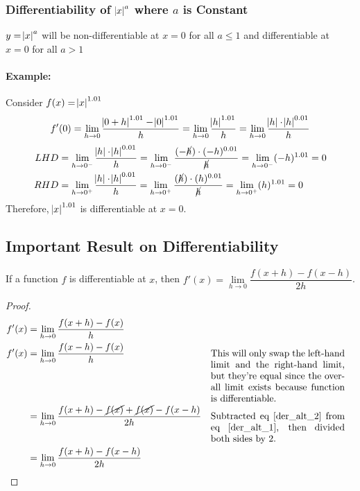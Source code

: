 \documentclass[14]{article}
\theoremstyle{definition}
\theoremstyle{case}
\begin{document}
\subsubsection{Differentiability of $\abs{x}^a$ where $a$ is Constant}
$y = \abs{x}^a$ will be non-differentiable at $x = 0$ for all $a \leq 1$ and differentiable at $x = 0$ for all $a > 1$\\
\paragraph{Example:} Consider $f(x) = \abs{x}^{1.01}$
\[
	f'(0) = \lim\limits_{h \to 0} \dfrac{\abs{0+h}^{1.01} - \abs{0}^{1.01}}{h} = \lim\limits_{h \to 0} \dfrac{\abs{h}^{1.01}}{h} = \lim\limits_{h \to 0} \dfrac{\abs{h} \cdot \abs{h}^{0.01}}{h}
\]
\begin{align*}
LHD &= \lim\limits_{h \to 0^-} \dfrac{\abs{h} \cdot \abs{h}^{0.01}}{h} = \lim\limits_{h \to 0^-} \dfrac{(-\cancel{h}) \cdot (-h)^{0.01}}{\cancel{h}} = \lim\limits_{h \to 0^-} (-h)^{1.01} = 0\\
RHD &= \lim\limits_{h \to 0^+} \dfrac{\abs{h} \cdot \abs{h}^{0.01}}{h} = \lim\limits_{h \to 0^+} \dfrac{(\cancel{h}) \cdot (h)^{0.01}}{\cancel{h}} = \lim\limits_{h \to 0^+} (h)^{1.01} = 0
\end{align*}
Therefore, $\abs{x}^{1.01}$ is differentiable at $x = 0$.
\pagebreak
\subsection{Important Result on Differentiability}
If a function $f$ is differentiable at $x$, then $f'(x) = \lim\limits_{h \to 0} \dfrac{f(x + h) - f(x - h)}{2h}$.\\
\begin{proof}
\begin{align}
f'(x) &= \lim\limits_{h \to 0} \dfrac{f(x+h) - f(x)}{h} \label{der_alt_1}\\
f'(x) &= \lim\limits_{h \to 0} \dfrac{f(x -h) - f(x)}{h} && \parbox[t]{5cm}{
          This will only swap the left-hand limit and the right-hand limit, but they're equal since the overall limit exists because function is differentiable.} \label{der_alt_2}\\
&= \lim\limits_{h \to 0} \dfrac{f(x + h) - \cancel{ f(x)} + \cancel{f(x)} - f(x - h)}{2h} && \parbox[t]{5cm}{Subtracted eq \eqref{der_alt_2} from eq \eqref{der_alt_1}, then divided both sides by 2.}\\
&= \lim\limits_{h \to 0} \dfrac{f(x + h) - f(x - h)}{2h}
\end{align}
\end{proof}
\end{document}
